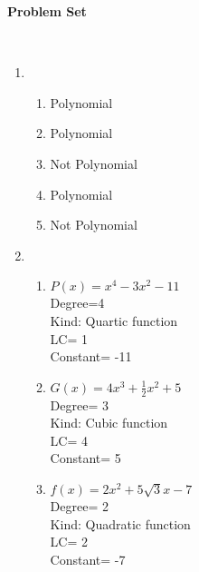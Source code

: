 \textbf{Problem Set}

\ 
\begin{enumerate}[label = \Alph*. ]
\item \phantom{a} 


\begin{enumerate}[label = \arabic*. ]

\item \hspce %
Polynomial 
\item \hspce%
Polynomial
\item \hspce %
Not Polynomial
\item \hspce %
Polynomial
\item \hspce %
Not Polynomial

\end{enumerate}

\item \phantom{b} %

\begin{enumerate}[label = \arabic*. ]

\item \hspce%
$P(x) =x^4-3x^2-11$\\
Degree=4 \\
Kind: Quartic function \\
LC= 1 \\
Constant= -11

\item \hspce %
$G(x) =\displaystyle 4x^3+ \frac{1}{2}x^2+5 $\\
Degree= 3 \\
Kind: Cubic function \\
LC= 4 \\
Constant= 5

\item \hspce %
$f(x) =2x^2+5\sqrt{3}x-7$\\
Degree= 2 \\
Kind: Quadratic function \\
LC= 2 \\
Constant= -7


\end{enumerate}
\end{enumerate}
